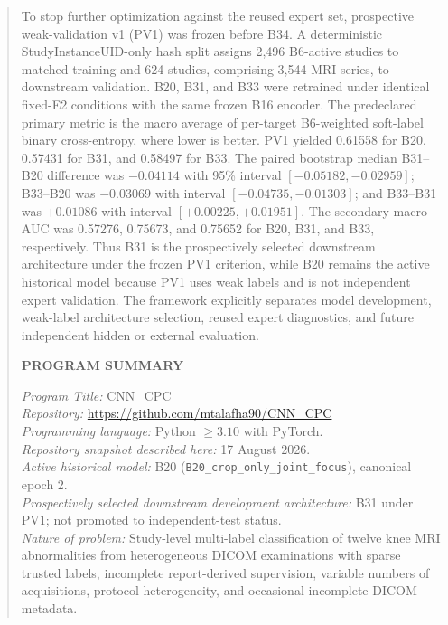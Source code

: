 \documentclass[preprint,12pt]{elsarticle}
\newcommand{\code}[1]{\texttt{#1}}
\begin{document}
\begin{frontmatter}
\begin{abstract}
To stop further optimization against the reused expert set, prospective weak-validation v1 (PV1) was frozen before B34. A deterministic StudyInstanceUID-only hash split assigns 2,496 B6-active studies to matched training and 624 studies, comprising 3,544 MRI series, to downstream validation. B20, B31, and B33 were retrained under identical fixed-E2 conditions with the same frozen B16 encoder. The predeclared primary metric is the macro average of per-target B6-weighted soft-label binary cross-entropy, where lower is better. PV1 yielded 0.61558 for B20, 0.57431 for B31, and 0.58497 for B33. The paired bootstrap median B31--B20 difference was $-0.04114$ with 95\% interval $[-0.05182,-0.02959]$; B33--B20 was $-0.03069$ with interval $[-0.04735,-0.01303]$; and B33--B31 was $+0.01086$ with interval $[+0.00225,+0.01951]$. The secondary macro AUC was 0.57276, 0.75673, and 0.75652 for B20, B31, and B33, respectively. Thus B31 is the prospectively selected downstream architecture under the frozen PV1 criterion, while B20 remains the active historical model because PV1 uses weak labels and is not independent expert validation. The framework explicitly separates model development, weak-label architecture selection, reused expert diagnostics, and future independent hidden or external evaluation.

\vspace{1em}
\noindent\textbf{PROGRAM SUMMARY}

\begin{small}
\noindent
{\em Program Title:} CNN\_CPC \\
{\em Repository:} \url{https://github.com/mtalafha90/CNN_CPC} \\
{\em Programming language:} Python $\geq 3.10$ with PyTorch. \\
{\em Repository snapshot described here:} 17 August 2026. \\
{\em Active historical model:} B20 (\code{B20\_crop\_only\_joint\_focus}), canonical epoch 2. \\
{\em Prospectively selected downstream development architecture:} B31 under PV1; not promoted to independent-test status. \\

{\em Nature of problem:} Study-level multi-label classification of twelve knee MRI abnormalities from heterogeneous DICOM examinations with sparse trusted labels, incomplete report-derived supervision, variable numbers of acquisitions, protocol heterogeneity, and occasional incomplete DICOM metadata. \\


\end{small}
\end{abstract}
\end{frontmatter}
\end{document}
